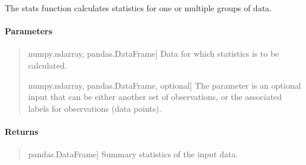\documentclass[letterpaper,10pt,english,openany,oneside]{sphinxmanual}
\begin{document}
\begin{fulllineitems}
\label{\detokenize{api_reference/generated/QuadratiK.tools.stats:QuadratiK.tools.stats}}
\pysigstartsignatures
{}
\pysigstopsignatures
\sphinxAtStartPar
The stats function calculates statistics for one or multiple groups of data.


\paragraph{Parameters}
\label{\detokenize{api_reference/generated/QuadratiK.tools.stats:parameters}}\begin{quote}
\begin{description}
\sphinxlineitem{x}{[}numpy.ndarray, pandas.DataFrame{]}
\sphinxAtStartPar
Data for which statistics is to be calculated.

\sphinxlineitem{y}{[}numpy.ndarray, pandas.DataFrame, optional{]}
\sphinxAtStartPar
The parameter  is an optional input that can be either another set of observations,
or the associated labels for observations (data points).

\end{description}
\end{quote}


\paragraph{Returns}
\label{\detokenize{api_reference/generated/QuadratiK.tools.stats:returns}}\begin{quote}
\begin{description}
\sphinxlineitem{summary statistics}{[}pandas.DataFrame{]}
\sphinxAtStartPar
Summary statistics of the input data.

\end{description}
\end{quote}



\end{fulllineitems}
\end{document}
